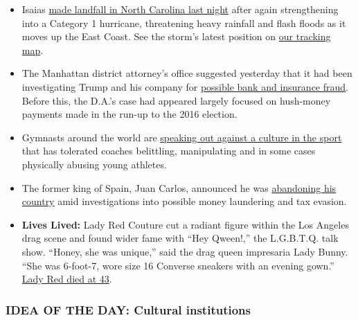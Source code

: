 \begin{itemize}
\item
  Isaias
  \href{https://www.nytimes.com/2020/08/04/us/isaias-storm-updates.html}{made
  landfall in North Carolina last night} after again strengthening into
  a Category 1 hurricane, threatening heavy rainfall and flash floods as
  it moves up the East Coast. See the storm's latest position on
  \href{https://www.nytimes.com/interactive/2020/07/31/us/hurricane-isaias-tracker-map.html}{our
  tracking map}.
\item
  The Manhattan district attorney's office suggested yesterday that it
  had been investigating Trump and his company for
  \href{https://www.nytimes.com/2020/08/03/nyregion/donald-trump-taxes-cyrus-vance.html}{possible
  bank and insurance fraud}. Before this, the D.A.'s case had appeared
  largely focused on hush-money payments made in the run-up to the 2016
  election.
\item
  Gymnasts around the world are
  \href{https://www.nytimes.com/2020/08/03/sports/olympics/gymnastics-abuse-athlete-a.html}{speaking
  out against a culture in the sport} that has tolerated coaches
  belittling, manipulating and in some cases physically abusing young
  athletes.
\item
  The former king of Spain, Juan Carlos, announced he was
  \href{https://www.nytimes.com/2020/08/03/world/europe/juan-carlos-leaves-spain.html}{abandoning
  his country} amid investigations into possible money laundering and
  tax evasion.
\item
  \textbf{Lives Lived:} Lady Red Couture cut a radiant figure within the
  Los Angeles drag scene and found wider fame with ``Hey Qween!,'' the
  L.G.B.T.Q. talk show. ``Honey, she was unique,'' said the drag queen
  impresaria Lady Bunny. ``She was 6-foot-7, wore size 16 Converse
  sneakers with an evening gown.''
  \href{https://www.nytimes.com/2020/08/01/arts/lady-red-couture-dead.html}{Lady
  Red died at 43}.
\end{itemize}

\hypertarget{idea-of-the-day-cultural-institutions}{%
\subsubsection{\texorpdfstring{\textbf{IDEA OF THE DAY: Cultural
institutions}}{IDEA OF THE DAY: Cultural institutions}}\label{idea-of-the-day-cultural-institutions}}

